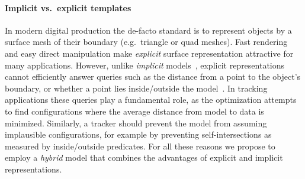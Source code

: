 

\paragraph{Implicit vs.\ explicit templates}
In modern digital production the de-facto standard is to represent objects by a surface mesh of their boundary (e.g.\ triangle or quad meshes). Fast rendering and easy direct manipulation make \emph{explicit} surface representation attractive for many applications.
%
However, unlike \emph{implicit} models~\cite{bloomenthal1997book}, explicit representations cannot efficiently answer queries such as the distance from a point to the object's boundary, or whether a point lies inside/outside the model~\cite[Ch.1]{botsch2010book}. In tracking applications these queries play a fundamental role, as the optimization attempts to find configurations where the average distance from model to data is minimized. Similarly, a tracker should prevent the model from assuming implausible configurations, for example by preventing self-intersections as measured by inside/outside predicates. For all these reasons 
 we propose to employ a \emph{hybrid} model that combines the advantages of explicit and implicit representations.


